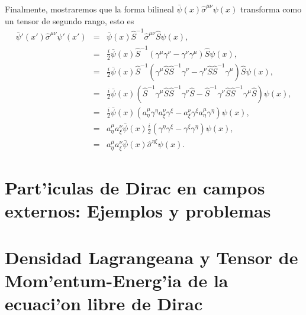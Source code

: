 Finalmente, mostraremos que la forma bilineal
$\bar{\psi}(x)\hat\sigma^{\mu\nu}\psi(x)$ transforma como un tensor de segundo
rango, esto es
\begin{eqnarray}
\bar{\psi}'(x')\hat\sigma^{\mu\nu}\psi'(x')&=&\bar{\psi}(x)\hat
S^{-1}\hat\sigma^{\mu\nu}\hat S\psi(x),
\nonumber\\
&=&\frac{i}{2}\bar{\psi}(x)\hat
S^{-1}(\gamma^\mu\gamma^\nu-\gamma^\nu\gamma^\mu)\hat S\psi(x),
\nonumber\\
&=&\frac{i}{2}\bar{\psi}(x)\hat S^{-1}(\gamma^\mu\hat S\hat
S^{-1}\gamma^\nu-\gamma^\nu\hat S\hat S^{-1}\gamma^\mu)\hat S\psi(x),
\nonumber\\
&=&\frac{i}{2}\bar{\psi}(x)(\hat S^{-1}\gamma^\mu\hat S\hat S^{-1}\gamma^\nu\hat
S-\hat S^{-1}\gamma^\nu\hat S\hat S^{-1}\gamma^\mu\hat S)\psi(x),
\nonumber\\
&=&\frac{i}{2}\bar{\psi}(x)(a^\mu_\eta\gamma^\eta
a^\nu_\xi\gamma^\xi-a^\nu_\xi\gamma^\xi a^\mu_\eta\gamma^\eta)\psi(x),
\nonumber\\
&=&a^\mu_\eta
a^\nu_\xi\bar{\psi}(x)\frac{i}{2}
(\gamma^\eta\gamma^\xi-\gamma^\xi\gamma^\eta)\psi(x),
\nonumber\\
&=&a^\mu_\eta a^\nu_\xi\bar{\psi}(x)\hat\sigma^{\eta\xi}\psi(x).
\end{eqnarray}



\section{Part'iculas de Dirac en campos externos: Ejemplos y problemas}




\section{Densidad Lagrangeana y Tensor de Mom'entum-Energ'ia de la
ecuaci'on libre de Dirac}

